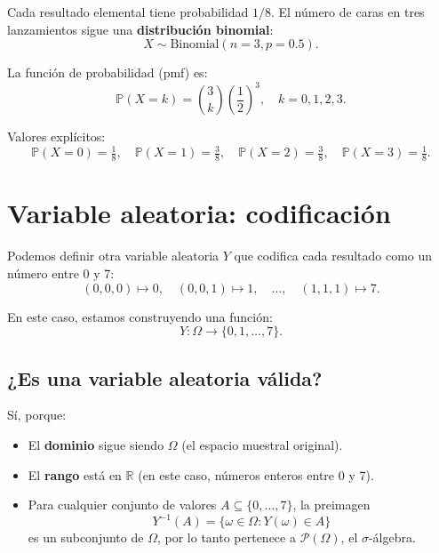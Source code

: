 \documentclass[12pt]{article}
\begin{document}
Cada resultado elemental tiene probabilidad $1/8$. El número de caras en tres
lanzamientos sigue una \textbf{distribución binomial}:
\begin{equation*}
X \sim \text{Binomial}(n=3, p=0.5).
\end{equation*}

La función de probabilidad (pmf) es:
\begin{equation*}
\mathbb{P}(X = k) = \binom{3}{k}\left(\frac{1}{2}\right)^3, \quad k=0,1,2,3.
\end{equation*}

\noindent Valores explícitos:
\begin{equation*}
\mathbb{P}(X=0) = \tfrac{1}{8}, \quad
\mathbb{P}(X=1) = \tfrac{3}{8}, \quad
\mathbb{P}(X=2) = \tfrac{3}{8}, \quad
\mathbb{P}(X=3) = \tfrac{1}{8}.
\end{equation*}

\section{Variable aleatoria: codificación}

Podemos definir otra variable aleatoria $Y$ que codifica cada resultado como un
número entre 0 y 7:
\begin{equation*}
(0,0,0) \mapsto 0, \quad (0,0,1) \mapsto 1, \quad \dots, \quad (1,1,1) \mapsto 7.
\end{equation*}

En este caso, estamos construyendo una función:
\begin{equation*}
Y : \Omega \to \{0,1,\dots,7\}.
\end{equation*}

\subsection{¿Es una variable aleatoria válida?}

Sí, porque:
\begin{itemize}
    \item El \textbf{dominio} sigue siendo $\Omega$ (el espacio muestral original).
    \item El \textbf{rango} está en $\mathbb{R}$ (en este caso, números enteros entre 0 y 7).
    \item Para cualquier conjunto de valores $A \subseteq \{0,\ldots,7\}$, la preimagen
    \begin{equation*}
        Y^{-1}(A) = \{\omega \in \Omega : Y(\omega) \in A\}
    \end{equation*}
    es un subconjunto de $\Omega$, por lo tanto pertenece a $\mathcal{P}(\Omega)$, el $\sigma$-álgebra.
\end{itemize}
\end{document}
